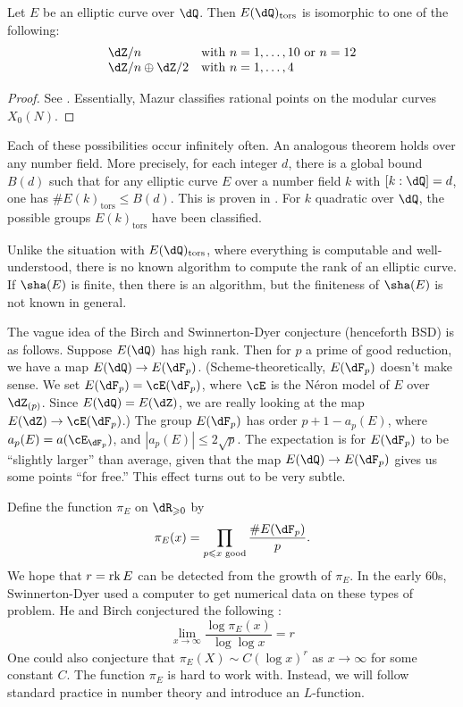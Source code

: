 \documentclass{article}
\begin{document}
\begin{theorem}
Let $E$ be an elliptic curve over $\dQ$. Then $E(\dQ)_\textnormal{tors}$ is 
isomorphic to one of the following:
\[
  \begin{array}{ll}
    \dZ/n & \text{with $n=1,\dots,10$ or $n=12$} \\
    \dZ/n\oplus \dZ/2 & \text{with $n=1,\dots,4$}
  \end{array}
\]
\end{theorem}
\begin{proof}
See \cite[III.5.1]{ma77}. Essentially, Mazur classifies rational points on the 
modular curves $X_0(N)$. 
\end{proof}

Each of these possibilities occur infinitely often. An analogous theorem holds 
over any number field. More precisely, for each integer $d$, there is a global 
bound $B(d)$ such that for any elliptic curve $E$ over a number field $k$ with 
$[k:\dQ]=d$, one has $\# E(k)_\text{tors} \leqslant B(d)$. This is proven in 
\cite{me96}. For $k$ quadratic over $\dQ$, the possible groups 
$E(k)_\text{tors}$ have been classified. 

Unlike the situation with $E(\dQ)_\text{tors}$, where everything is computable 
and well-understood, there is no known algorithm to compute the rank of an 
elliptic curve. If $\sha(E)$ is finite, then there is an algorithm, but the 
finiteness of $\sha(E)$ is not known in general. 

The vague idea of the Birch and Swinnerton-Dyer conjecture (henceforth BSD) is 
as follows. Suppose $E(\dQ)$ has high rank. Then for $p$ a prime of good 
reduction, we have a map $E(\dQ) \to E(\dF_p)$. (Scheme-theoretically, 
$E(\dF_p)$ doesn't make sense. We set $E(\dF_p) = \cE(\dF_p)$, where 
$\cE$ is the N\'eron model of $E$ over $\dZ_{(p)}$. Since 
$E(\dQ) = E(\dZ)$, we are really looking at the map 
$E(\dZ) \to \cE(\dF_p)$.) The group $E(\dF_p)$ has order 
$p+1-a_p(E)$, where $a_p(E) = a(\cE_{\dF_p})$, and 
$|a_p(E)|\leqslant 2\sqrt p$. The expectation is for $E(\dF_p)$ to be 
``slightly larger'' than average, given that the map 
$E(\dQ) \to E(\dF_p)$ gives us some points ``for free.'' This effect turns out 
to be very subtle. 

Define the function $\pi_E$ on $\dR_{\geqslant 0}$ by 
\[
  \pi_E(x) = \prod_{p\leqslant x \text{ good}} \frac{\# E(\dF_p)}{p} \text{.}
\]
We hope that $r=\operatorname{rk} E$ can be detected from the growth of $\pi_E$. In the 
early 60s, Swinnerton-Dyer used a computer to get numerical data on these 
types of problem. He and Birch conjectured the following \cite[A]{bsd65}: 
\[
  \lim_{x\to \infty} \frac{\log \pi_E(x)}{\log \log x} = r
\]
One could also conjecture that $\pi_E(X) \sim C (\log x)^r$ as $x\to \infty$ 
for some constant $C$. The function $\pi_E$ is hard to work with. Instead, we 
will follow standard practice in number theory and introduce an $L$-function. 
\end{document}
